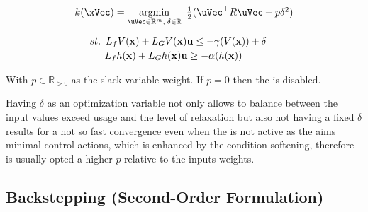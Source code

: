 \begin{equation}
    \begin{array}{l}
        k(\xVec) = \underset{\uVec \in \mathbb{R}^m, \hspace{0.2em} \delta \in \mathbb{R}}{\mathrm{argmin}} \quad \hspace{-0.5em} \frac{1}{2} (\uVec^\top R \uVec + p\delta^2 ) \vspace{1em} \\ 
        \quad \hspace{0.5em}  st. \hspace{0.5em} L_fV(\mathbf{x}) + L_GV(\mathbf{x})\mathbf{u} \leq -\gamma(V(\mathbf{x})) + \delta \vspace{0.25em}\\
        \quad \quad \hspace{1em} L_fh(\mathbf{x}) + L_Gh(\mathbf{x})\mathbf{u} \geq -\alpha(h(\mathbf{x}))
    \end{array}
 \label{eq:CLF-CBF-QP-relaxed}
\end{equation}

With \(p \in \mathbb{R}_{>0}\) as the slack variable weight. If \(p = 0\) then the  is disabled. \par

\newpage %

Having \(\delta\) as an optimization variable not only allows to balance between the input values exceed usage and the level of relaxation but also not having a fixed \(\delta\) results for a not so fast convergence even when the  is not active as the  aims minimal control actions, which is enhanced by the  condition softening, therefore is usually opted a higher \(p\) relative to the inputs weights. \\




\subsection{Backstepping (Second-Order Formulation)}
\label{sub:backstepping}

